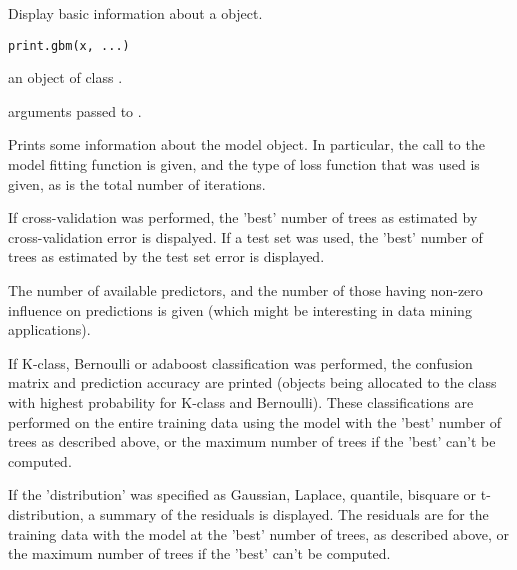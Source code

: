 \documentclass{article}
\begin{document}
\begin{Description}\relax
Display basic information about a  object.
\end{Description}
\begin{Usage}
\begin{verbatim}
print.gbm(x, ...)
\end{verbatim}
\end{Usage}
\begin{Arguments}
\begin{ldescription}
\item[\code{x}] an object of class . 
\item[\code{...}] arguments passed to . 
\end{ldescription}
\end{Arguments}
\begin{Details}\relax
Prints some information about the model object. In particular, the call
to the model fitting function is given, and the type of loss function
that was used is given, as is the total number of iterations.

If cross-validation was performed, the 'best' number of trees as
estimated
by cross-validation error is
dispalyed. If a test set was used, the 'best' number
of trees as estimated by the test set error is displayed.

The number of available predictors, and the number of those having
non-zero influence on predictions is given (which might be interesting
in data mining applications).

If K-class, Bernoulli or adaboost classification was performed,
the confusion matrix and prediction accuracy are printed (objects
being allocated to the class with highest probability for K-class
and Bernoulli). These classifications are performed on the entire
training
data using the model with the 'best' number of trees as described
above, or the maximum number of trees if the 'best' can't be
computed.

If the 'distribution' was specified as Gaussian, Laplace, quantile,
bisquare or t-distribution, a summary of the residuals is displayed.
The residuals are for the training data with the model at the 'best' number of trees, as
described above, or the maximum number of trees if the 'best' can't
be computed.
\end{Details}
\end{document}
